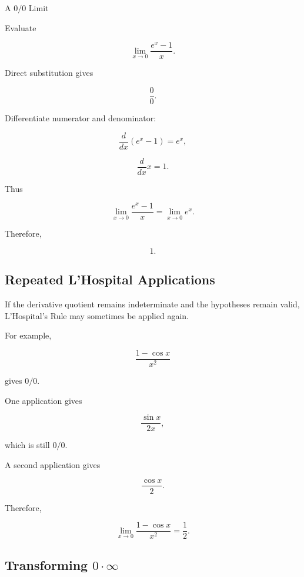 \begin{workedexamplebox}{A \(0/0\) Limit}

Evaluate

\[
\lim_{x\to0}
\frac{
e^x-1
}{
x
}.
\]

Direct substitution gives

\[
\frac00.
\]

Differentiate numerator and denominator:

\[
\frac{d}{dx}(e^x-1)=e^x,
\]

\[
\frac{d}{dx}x=1.
\]

Thus

\[
\lim_{x\to0}
\frac{
e^x-1
}{
x
}
=
\lim_{x\to0}
e^x.
\]

Therefore,

\begin{answerbox}
\[
\boxed{
1.
}
\]
\end{answerbox}

\end{workedexamplebox}

\subsection{Repeated L'Hospital Applications}
\label{subsec:repeated-lhospital}

If the derivative quotient remains indeterminate and the hypotheses remain
valid, L'Hospital's Rule may sometimes be applied again.

For example,

\[
\frac{
1-\cos x
}{
x^2
}
\]

gives \(0/0\).

One application gives

\[
\frac{
\sin x
}{
2x
},
\]

which is still \(0/0\).

A second application gives

\[
\frac{
\cos x
}{
2
}.
\]

Therefore,

\[
\boxed{
\lim_{x\to0}
\frac{
1-\cos x
}{
x^2
}
=
\frac12.
}
\]

\subsection{Transforming \(0\cdot\infty\)}
\label{subsec:zero-times-infinity}

